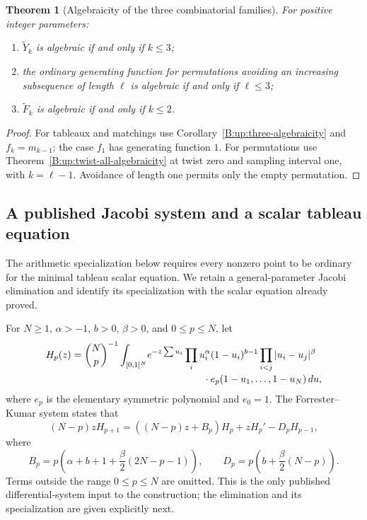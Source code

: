 \documentclass[11pt,a4paper]{article}
\newtheorem{theorem}{Theorem}[section]
\theoremstyle{definition}
\theoremstyle{remark}
\numberwithin{equation}{section}
\begin{document}
\begin{theorem}[Algebraicity of the three combinatorial families]
\label{E:sfb:algebraicity}
For positive integer parameters:
\begin{enumerate}
\item $\widetilde Y_k$ is algebraic if and only if $k\le3$;
\item the ordinary generating function for permutations avoiding
      an increasing subsequence of length $\ell$ is algebraic
      if and only if $\ell\le3$;
\item $\widetilde F_k$ is algebraic if and only if $k\le2$.
\end{enumerate}
\end{theorem}
\begin{proof}
For tableaux and matchings use
Corollary~\ref{B:up:three-algebraicity} and $f_k=m_{k-1}$;
the case $f_1$ has generating function $1$.
For permutations use Theorem~\ref{B:up:twist-all-algebraicity}
at twist zero and sampling interval one, with $k=\ell-1$.
Avoidance of length one permits only the empty permutation.
\end{proof}

\subsection{A published Jacobi system and a scalar tableau equation}

The arithmetic specialization below requires every nonzero
point to be ordinary for the minimal tableau scalar equation.
We retain a general-parameter Jacobi elimination and identify its specialization with the scalar equation already proved.

For $N\ge1$, $\alpha>-1$, $b>0$, $\beta>0$, and $0\le p\le N$, let
\[
 \begin{aligned}
 H_p(z)=\binom Np^{-1}\int_{[0,1]^N}
 &e^{-z\sum u_i}\prod_i u_i^\alpha(1-u_i)^{b-1}
 \prod_{i<j}|u_i-u_j|^\beta\\[-2pt]
 &\hspace{20mm}\cdot e_p(1-u_1,\ldots,1-u_N)\,du,
 \end{aligned}
\]
where $e_p$ is the elementary symmetric polynomial and $e_0=1$.
The Forrester--Kumar system
\cite[Corollary 2.5, equations (2.19)--(2.20)]{FK22}
states that
\begin{equation}\label{E:sfb:FKsystem}
 (N-p)zH_{p+1}=((N-p)z+B_p)H_p+zH_p'-D_pH_{p-1},
\end{equation}
where
\[
 B_p=p\left(\alpha+b+1+\frac\beta2(2N-p-1)\right),\qquad
 D_p=p\left(b+\frac\beta2(N-p)\right).
\]
Terms outside the range $0\le p\le N$ are omitted.
This is the only published differential-system input to the
construction; the elimination and its specialization are given
explicitly next.
\end{document}
